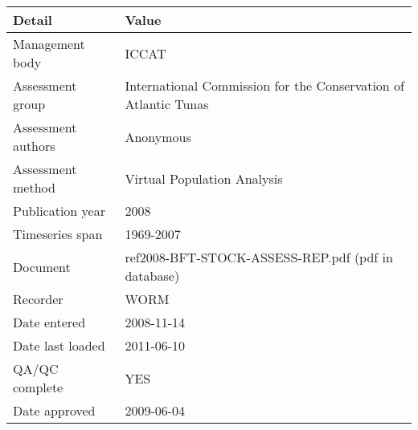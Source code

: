 \begin{table}[htb]
\centering
\begin{tabular}{lp{7cm}}
\toprule
Detail & Value \\
\midrule
Management body    & ICCAT                                                           \\
Assessment group   & International Commission for the Conservation of Atlantic Tunas \\
Assessment authors & Anonymous                                                       \\
Assessment method  & Virtual Population Analysis                                     \\
Publication year   & 2008                                                            \\
Timeseries span    & 1969-2007                                                       \\
Document           & ref2008-BFT-STOCK-ASSESS-REP.pdf (pdf in database)              \\
Recorder           & WORM                                                            \\
Date entered       & 2008-11-14                                                      \\
Date last loaded   & 2011-06-10                                                      \\
QA/QC complete     & YES                                                             \\
Date approved      & 2009-06-04                                                      \\
\bottomrule
\end{tabular}
\label{tab:assessdet}
\end{table}

